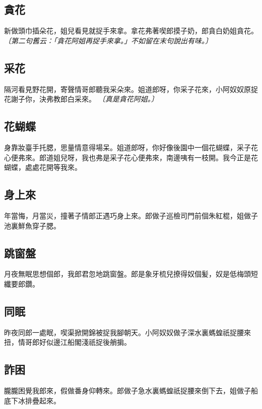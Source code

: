 \subsection*{貪花}

新做頭巾插朵花，姐兒看見就捉手來拿。拿花弗著喫郎摸子奶，郎貪白奶姐貪花。
\textit{〔第二句舊云：「貪花阿姐再捉手來拿。」不如留在末句說出有味。〕}

\subsection*{采花}

隔河看見野花開，寄聲情哥郎聽我采朵來。姐道郎呀，你采子花來，小阿奴奴原捉花謝子你，決弗教郎白采來。
\textit{〔真是貪花阿姐。〕}

\subsection*{花蝴蝶}

身靠妝臺手托腮，思量情意得場呆。姐道郎呀，你好像後園中一個花蝴蝶，采子花心便弗來。郎道姐兒呀，我也弗是采子花心便弗來，南邊咦有一枝開。我今正是花蝴蝶，處處花開等我來。

\subsection*{身上來}

年當悔，月當災，撞著子情郎正遇巧身上來。郎做子巡檢司門前個朱紅棍，姐做子池裏鮮魚穿子腮。

\subsection*{跳窗盤}

月夜無眠思想個郎，我郎君忽地跳窗盤。郎是象牙梳兒撩得奴個髪，奴是低梅頭短纖要郎鑽。

\subsection*{同眠}

昨夜同郎一處眠，喫渠掀開錦被捉我腳朝天。小阿奴奴做子深水裏螞蝗祇捉腰來扭，情哥郎好似邊江船閣淺祇捉後艄掮。

\subsection*{詐困}

朧朧困覺我郎來，假做番身仰轉來。郎做子急水裏螞蝗祇捉腰來倒下去，姐做子船底下冰排疊起來。

